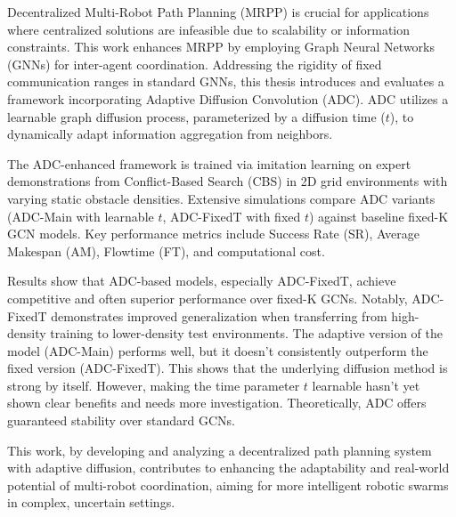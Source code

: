 Decentralized Multi-Robot Path Planning (MRPP) is crucial for applications where centralized solutions are infeasible due to scalability or information constraints. This work enhances MRPP by employing Graph Neural Networks (GNNs) for inter-agent coordination. Addressing the rigidity of fixed communication ranges in standard GNNs, this thesis introduces and evaluates a framework incorporating Adaptive Diffusion Convolution (ADC). ADC utilizes a learnable graph diffusion process, parameterized by a diffusion time ($t$), to dynamically adapt information aggregation from neighbors. 

The ADC-enhanced framework is trained via imitation learning on expert demonstrations from Conflict-Based Search (CBS) in 2D grid environments with varying static obstacle densities. Extensive simulations compare ADC variants (ADC-Main with learnable $t$, ADC-FixedT with fixed $t$) against baseline fixed-K GCN models. Key performance metrics include Success Rate (SR), Average Makespan (AM), Flowtime (FT), and computational cost. 

Results show that ADC-based models, especially ADC-FixedT, achieve competitive and often superior performance over fixed-K GCNs. Notably, ADC-FixedT demonstrates improved generalization when transferring from high-density training to lower-density test environments. The adaptive version of the model (ADC-Main) performs well, but it doesn't consistently outperform the fixed version (ADC-FixedT). This shows that the underlying diffusion method is strong by itself. However, making the time parameter $t$ learnable hasn't yet shown clear benefits and needs more investigation. Theoretically, ADC offers guaranteed stability over standard GCNs.

This work, by developing and analyzing a decentralized path planning system with adaptive diffusion, contributes to enhancing the adaptability and real-world potential of multi-robot coordination, aiming for more intelligent robotic swarms in complex, uncertain settings.
